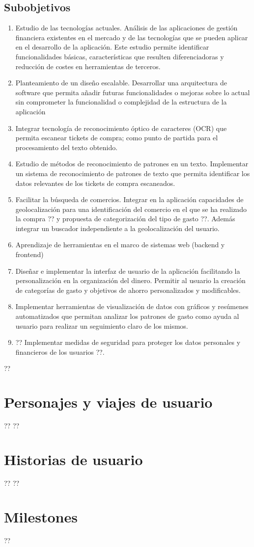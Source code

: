 \subsection{Subobjetivos}
\begin{enumerate}
    \item Estudio de las tecnologías actuales. Análisis de las aplicaciones 
        de gestión financiera existentes en el mercado y de las tecnologías 
        que se pueden aplicar en el desarrollo de la aplicación. Este estudio 
        permite identificar funcionalidades básicas, características que
        resulten diferenciadoras y reducción de costes en herramientas de terceros.
    \item Planteamiento de un diseño escalable. Desarrollar una arquitectura de
        software que permita añadir futuras funcionalidades o mejoras sobre lo actual 
        sin comprometer la funcionalidad o complejidad de la estructura de la aplicación
    \item Integrar tecnología de reconocimiento óptico de caracteres (OCR) que 
        permita escanear tickets de compra; como punto de partida para el procesamiento 
        del texto obtenido.
    \item Estudio de métodos de reconocimiento de patrones en un texto. Implementar 
        un sistema de reconocimiento de patrones de texto que permita identificar 
        los datos relevantes de los tickets de compra escaneados.
    \item Facilitar la búsqueda de comercios. Integrar en la aplicación capacidades de geolocalización 
        para una identificación del comercio en el que se ha realizado la compra 
        ?? y propuesta de categorización del tipo de gasto ??. Además integrar un buscador 
        independiente a la geolocalización del usuario.     
    \item Aprendizaje de herramientas en el marco de sistemas web (backend y frontend)
    \item Diseñar e implementar la interfaz de usuario de la aplicación facilitando
         la personalización en la organización del dinero. Permitir al usuario la creación 
         de categorías de gasto y objetivos de ahorro personalizados y modificables.
    \item Implementar herramientas de visualización de datos con gráficos y resúmenes 
        automatizados que permitan analizar los patrones de gasto como ayuda al usuario 
        para realizar un seguimiento claro de los mismos.
    \item ?? Implementar medidas de seguridad para proteger los datos personales y 
        financieros de los usuarios ??.
    
\end{enumerate}



?? \section{Personajes y viajes de usuario} ??
?? \section{Historias de usuario} ??
?? \section{Milestones} ??